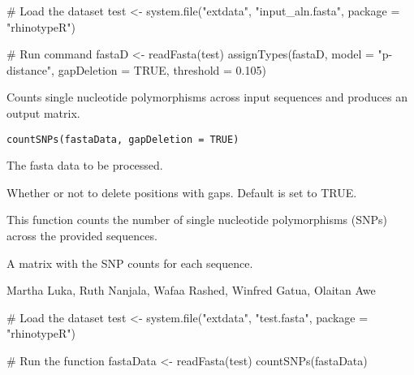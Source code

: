 \documentclass[a4paper]{book}
\begin{document}
%
\begin{Examples}
\begin{ExampleCode}
# Load the dataset
test <- system.file("extdata", "input_aln.fasta", package = "rhinotypeR")

# Run command
fastaD <- readFasta(test)
assignTypes(fastaD, model = "p-distance", gapDeletion = TRUE, threshold = 0.105)
\end{ExampleCode}
\end{Examples}
%
\begin{Description}
Counts single nucleotide polymorphisms across input sequences and 
produces an output matrix.
\end{Description}
%
\begin{Usage}
\begin{verbatim}
countSNPs(fastaData, gapDeletion = TRUE)
\end{verbatim}
\end{Usage}
%
\begin{Arguments}
\begin{ldescription}
\item[\code{fastaData}] 
The fasta data to be processed.

\item[\code{gapDeletion}] 
Whether or not to delete positions with gaps. Default is set to TRUE.

\end{ldescription}
\end{Arguments}
%
\begin{Details}
This function counts the number of single nucleotide polymorphisms 
(SNPs) across the provided sequences.
\end{Details}
%
\begin{Value}
A matrix with the SNP counts for each sequence.
\end{Value}
%
\begin{Author}
Martha Luka, Ruth Nanjala, Wafaa Rashed, Winfred Gatua, Olaitan Awe 
\end{Author}
%
\begin{SeeAlso}
\end{SeeAlso}
%
\begin{Examples}
\begin{ExampleCode}
# Load the dataset
test <- system.file("extdata", "test.fasta", package = "rhinotypeR")

# Run the function
fastaData <- readFasta(test)
countSNPs(fastaData)
\end{ExampleCode}
\end{Examples}
\end{document}

